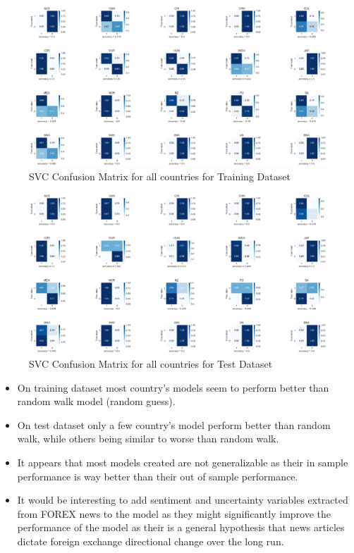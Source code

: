 \documentclass{article}
\begin{document}
\begin{figure}[H]
    \centering
    \hspace*{-1.25in}
    \includegraphics[scale = .30]{images/direction/clf_cm_train.png}
    \caption{SVC Confusion Matrix for all countries for Training Dataset}
    \label{simulationfigure}
\end{figure}

\begin{figure}[H]
    \centering
    \hspace*{-1.25in}
    \includegraphics[scale = .30]{images/direction/clf_cm_test.png}
    \caption{SVC Confusion Matrix for all countries for Test Dataset}
    \label{simulationfigure}
\end{figure}

\begin{itemize}
  \item On training dataset most country's models seem to perform better than random walk model (random guess).
  \item On test dataset only a few country's model perform better than random walk, while others being similar to worse than random walk.
  \item It appears that most models created are not generalizable as their in sample performance is way better than their out of sample performance.
  \item It would be interesting to add sentiment and uncertainty variables extracted from FOREX news to the model as they might significantly improve the performance
        of the model as their is a general hypothesis that news articles dictate foreign exchange directional change over the long run.
\end{itemize}
\end{document}
